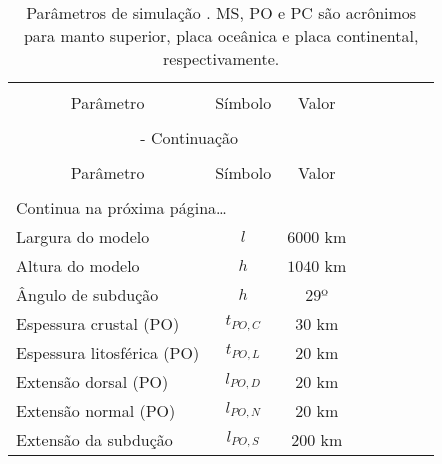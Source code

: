 \begin{center}
    \setcaptionmargin{1cm}
    \scriptsize
    \begin{longtable}{lccccccc}
        \caption[Parâmetros de simulação \citep{strak2021thermo}.]{Parâmetros de simulação \citep{strak2021thermo}. MS, PO e PC são acrônimos para manto superior, placa oceânica e placa continental, respectivamente.}\\
        \hline \hline \\[-2ex]
        \multicolumn{1}{c}{Parâmetro} &
        \multicolumn{1}{c}{Símbolo} &
        \multicolumn{1}{c}{Valor} &

        \\[0.5ex] \hline
        \\[-1.8ex]
        
        \endfirsthead
        
        \multicolumn{4}{c}{\footnotesize{{\slshape{{\tablename} \thetable{}}} - Continuação}}\\[0.5ex]
        
        \hline \hline\\[-2ex]
        
        \multicolumn{1}{c}{Parâmetro} &
        \multicolumn{1}{c}{Símbolo} &
        \multicolumn{1}{c}{Valor} &
        
        \\[0.5ex] \hline
        \\[-1.8ex]
        
        \endhead
        
        \multicolumn{5}{l}{{\footnotesize{Continua na próxima página\ldots}}}\\
        \endfoot
        \hline
        
        \endlastfoot

        Largura do modelo & $l$ & $6000$ km \\
        Altura do modelo & $h$ & $1040$ km \\
        Ângulo de subdução & $h$ & $29$º \\

        Espessura crustal (PO) & $t_{PO,C}$ & $30$ km \\
        Espessura litosférica (PO) & $t_{PO,L}$ & $20$ km \\
        Extensão dorsal (PO) & $l_{PO,D}$ & $20$ km \\
        Extensão normal (PO) & $l_{PO,N}$ & $20$ km \\
        Extensão da subdução & $l_{PO,S}$ & $200$ km \\
    

\end{longtable}
\end{center}
